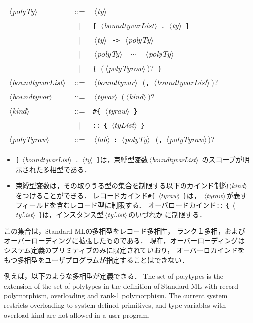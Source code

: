 \documentclass{jbook}
\newcommand{\vbar}{\mbox{\ $|$\ }}
\newcommand{\nonterm}[1]{\mbox{$\,\langle$}{\it #1}\mbox{$\rangle\,$}}
\newcommand{\term}[1]{\mbox{{\tt #1}}}
\newcommand{\optional}[1]{\mbox{$($}{\protect #1}\mbox{$)?$}}
\begin{document}
\begin{center}
\begin{tabular}{lcll}
\nonterm{polyTy} &::=& \nonterm{ty}\\
&\vbar& \term{[} \nonterm{boundtyvarList} \term{.} \nonterm{ty} \term{]}\\
&\vbar& \nonterm{ty}\ \term{->}\ \nonterm{polyTy}\\
&\vbar& \nonterm{polyTy}\ \term{*} $\cdots$\ \term{*}\ \nonterm{polyTy}\\
&\vbar& \term{\{}\ \optional{\nonterm{polyTyrow}}\ \term{\}}\\
\nonterm{boundtyvarList} &::=& \nonterm{boundtyvar}\ \optional{\term{,} \nonterm{boundtyvarList}}\\
\nonterm{boundtyvar} &::=& \nonterm{tyvar} \optional{\nonterm{kind}}\\
\nonterm{kind} 
&::=& \term{\#\{} \nonterm{tyraw} \term{\}}\\
&\vbar& \term{::} \term{\{} \nonterm{tyList} \term{\}}\\
\nonterm{polyTyraw}&::=& \nonterm{lab} \term{:} \nonterm{polyTy}\ \optional{\term{,} \nonterm{polyTyraw}} 
\end{tabular}
\end{center}
\begin{itemize}
\item \term{[} \nonterm{boundtyvarList} \term{.} \nonterm{ty} \term{]}は，束縛型変数\nonterm{boundtyvarList}
のスコープが明示された多相型である．
\item 束縛型変数は，その取りうる型の集合を制限する以下のカインド制約\nonterm{kind}をつけることができる．
	レコードカインド\term{\#\{} \nonterm{tyraw} \term{\}}は，
\nonterm{tyraw}が表すフィールドを含むレコード型に制限する．
	オーバロードカインド\term{::} \term{\{} \nonterm{tyList} \term{\}}は，インスタンス型\nonterm{tyList}のいづれか
に制限する．
\end{itemize}

\ifjp%
	この集合は，Standard MLの多相型をレコード多相性，
ランク１多相，およびオーバーローディングに拡張したものである．
	現在，オーバーローディングはシステム定義のプリミティブのみに限定されていおり，
オーバーロカインドをもつ多相型をユーザプログラムが指定することはできない．

	例えば，以下のような多相型が定義できる．
\else%
	The set of polytypes is the extension of the set of polytypes in
the definition of Standard ML with record polymorphism, overloading and
rank-1 polymorphism.
	The current system restricts overloading to system defined
primitives, and type variables with overload kind are not allowed in a
user program.
\end{document}
